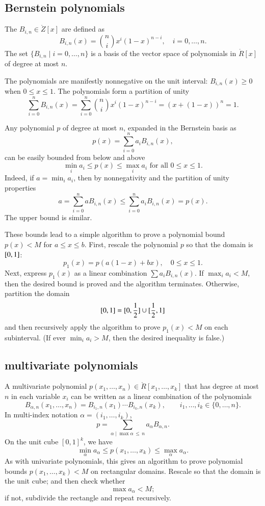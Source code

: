 \subsection{Bernstein polynomials}

The  $B_{i,n}\in\ring{Z}[x]$ are defined as
\begin{equation}
B_{i,n}(x) = {n\choose i} x^i (1-x)^{n-i},\quad i=0,\ldots,n.
\end{equation}
The set $\{B_{i,n}\mid i=0,\ldots,n\}$ is a basis of the vector space
of polynomials in $\ring{R}[x]$ of degree at most $n$.

The polynomials are manifestly nonnegative on the unit interval:
$B_{i,n}(x)\ge 0$ when $0\le x\le 1$.  The polynomials form a
partition of unity
\[
\sum_{i=0}^n B_{i,n}(x) = \sum_{i=0}^n {n\choose i} x^i (1-x)^{n-i} = 
(x + (1-x))^n = 1.
\]

Any polynomial $p$ of degree at most $n$, 
expanded in the Bernstein basis as
\[
p(x) =  \sum_{i=0}^n a_i B_{i,n}(x),
\]
can be easily bounded from below and above
\[
\min_i a_i \le p(x) \le \max_i a_i\text{\ \  for all } 0 \le x \le 1.
\]
Indeed, if $a = \min_i a_i$, then by nonnegativity and the partition
of unity properties
\[
a  =  \sum_{i=0}^n a B_{i,n}(x) \le \sum_{i=0}^n a_i B_{i,n}(x) = p(x).
\]
The upper bound is similar.

These bounds lead to a simple algorithm to prove a polynomial bound
$p(x) < M$ for $a\le x\le b$.  First, rescale the polynomial $p$ so
that the domain is $[ 0,1]$:
\[
p_1(x) = p(a (1-x) + b x), \quad 0\le x \le 1.
\]
Next, express $p_1(x)$ as a linear combination $\sum a_i B_{i,n}(x)$.
If $\max_i a_i < M$, then the desired bound is proved and the algorithm
terminates.  Otherwise,
 partition the domain
\[
[ 0,1] = [  0,\frac{1}{2}]
\cup [  \frac{1}{2},1]
\]
and then recursively apply the algorithm to prove $p_1(x)<M$ on each
subinterval.   (If ever $\min_i a_i > M$, then the desired inequality is false.)


\subsection{multivariate polynomials}

A multivariate polynomial $p(x_1,\ldots,x_n)\in \ring{R}[x_1,\ldots,x_k]$ that
has degree at most $n$ in each variable $x_i$ can be written as a linear
combination of the polynomials
\[
B_{\alpha,n}(x_1,\ldots,x_n)=B_{i_1,n}(x_1)\cdots B_{i_k,n}(x_k),\qquad
 i_1,\ldots,i_k\in \{0,\ldots,n\}.
\]
In multi-index notation $\alpha=(i_1,\ldots,i_k)$, 
\[
p = \sum_{\alpha\mid \max{\alpha}\,\le\, n} a_\alpha B_{\alpha,n}.
\]
On the unit cube $[0,1]^k$, we have
\[
\min_\alpha a_\alpha \le p(x_1,\ldots,x_k) \le \max_\alpha a_\alpha.
\]
As with univariate polynomials, this gives an algorithm to prove
polynomial bounds $p(x_1,\ldots,x_k)<M$ on rectangular domains.
Rescale so that the domain is the unit cube; and then check whether
\[
\max a_\alpha < M;
\]
if not, subdivide the rectangle and repeat recursively.



